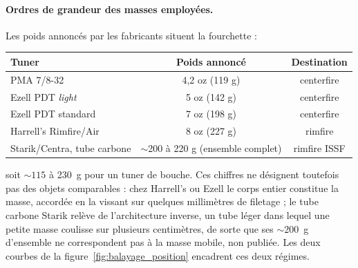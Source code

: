 \documentclass[12pt,a4paper]{article}
\begin{document}
	\paragraph{Ordres de grandeur des masses employées.} Les poids annoncés par les fabricants situent la fourchette :
	\begin{center}
	\begin{tabular}{lcc}
		\toprule
		Tuner & Poids annoncé & Destination \\
		\midrule
		PMA 7/8-32 & 4,2 oz (119 g) & centerfire \\
		Ezell PDT \emph{light} & 5 oz (142 g) & centerfire \\
		Ezell PDT standard & 7 oz (198 g) & centerfire \\
		Harrell's Rimfire/Air & 8 oz (227 g) & rimfire \\
		Starik/Centra, tube carbone & $\sim$200 à 220 g (ensemble complet) & rimfire ISSF \\
		\bottomrule
	\end{tabular}
	\end{center}
	soit $\sim 115$ à 230~g pour un tuner de bouche. Ces chiffres ne désignent toutefois pas des objets comparables : chez Harrell's ou Ezell le corps entier constitue la masse, accordée en la vissant sur quelques millimètres de filetage ; le tube carbone Starik relève de l'architecture inverse, un tube léger dans lequel une petite masse coulisse sur plusieurs centimètres, de sorte que ses $\sim 200$~g d'ensemble ne correspondent pas à la masse mobile, non publiée. Les deux courbes de la figure~\ref{fig:balayage_position} encadrent ces deux régimes.
\end{document}
